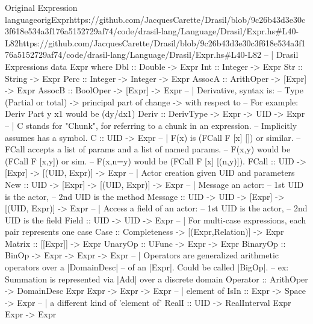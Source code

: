 \begin{haskell}{Original Expression language}{origExpr}{https://github.com/JacquesCarette/Drasil/blob/9c26b43d3e30c3f618e534a3f176a5152729a\linebreak{}f74/code/drasil-lang/Language/Drasil/Expr.hs\#L40-L82}{https://github.com/JacquesCarette/Drasil/blob/9c26b43d3e30c3f618e534a3f176a5152729af74/code/drasil-lang/Language/Drasil/Expr.hs\#L40-L82}
-- | Drasil Expressions
data Expr where
  Dbl      :: Double -> Expr
  Int      :: Integer -> Expr
  Str      :: String -> Expr
  Perc     :: Integer -> Integer -> Expr
  AssocA   :: ArithOper -> [Expr] -> Expr
  AssocB   :: BoolOper  -> [Expr] -> Expr
  -- | Derivative, syntax is:
  --   Type (Partial or total) -> principal part of change -> with respect to
  --   For example: Deriv Part y x1 would be (dy/dx1)
  Deriv    :: DerivType -> Expr -> UID -> Expr
  -- | C stands for "Chunk", for referring to a chunk in an expression.
  --   Implicitly assumes has a symbol.
  C        :: UID -> Expr
  -- | F(x) is (FCall F [x] []) or similar.
  --   FCall accepts a list of params and a list of named params.
  --   F(x,y) would be (FCall F [x,y]) or sim.
  --   F(x,n=y) would be (FCall F [x] [(n,y)]).
  FCall    :: UID -> [Expr] -> [(UID, Expr)] -> Expr
  -- | Actor creation given UID and parameters 
  New      :: UID -> [Expr] -> [(UID, Expr)] -> Expr 
  -- | Message an actor: 
  --   1st UID is the actor, 
  --   2nd UID is the method
  Message  :: UID -> UID -> [Expr] -> [(UID, Expr)] -> Expr
  -- | Access a field of an actor:
  --   1st UID is the actor,
  --   2nd UID is the field
  Field :: UID -> UID -> Expr
  -- | For multi-case expressions, each pair represents one case
  Case     :: Completeness -> [(Expr,Relation)] -> Expr
  Matrix   :: [[Expr]] -> Expr
  UnaryOp  :: UFunc -> Expr -> Expr
  BinaryOp :: BinOp -> Expr -> Expr -> Expr
  -- | Operators are generalized arithmetic operators over a |DomainDesc|
  --   of an |Expr|.  Could be called |BigOp|.
  --   ex: Summation is represented via |Add| over a discrete domain
  Operator :: ArithOper -> DomainDesc Expr Expr -> Expr -> Expr
  -- | element of
  IsIn     :: Expr -> Space -> Expr 
  -- | a different kind of 'element of'
  RealI    :: UID -> RealInterval Expr Expr -> Expr 
\end{haskell}
